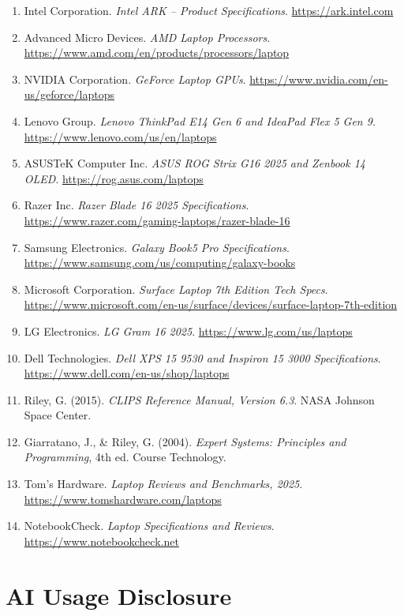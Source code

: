\documentclass[12pt,a4paper]{article}
\begin{document}
\begin{enumerate}
    \item Intel Corporation. \textit{Intel ARK -- Product Specifications}. \url{https://ark.intel.com}
    \item Advanced Micro Devices. \textit{AMD Laptop Processors}. \url{https://www.amd.com/en/products/processors/laptop}
    \item NVIDIA Corporation. \textit{GeForce Laptop GPUs}. \url{https://www.nvidia.com/en-us/geforce/laptops}
    \item Lenovo Group. \textit{Lenovo ThinkPad E14 Gen 6 and IdeaPad Flex 5 Gen 9}. \url{https://www.lenovo.com/us/en/laptops}
    \item ASUSTeK Computer Inc. \textit{ASUS ROG Strix G16 2025 and Zenbook 14 OLED}. \url{https://rog.asus.com/laptops}
    \item Razer Inc. \textit{Razer Blade 16 2025 Specifications}. \url{https://www.razer.com/gaming-laptops/razer-blade-16}
    \item Samsung Electronics. \textit{Galaxy Book5 Pro Specifications}. \url{https://www.samsung.com/us/computing/galaxy-books}
    \item Microsoft Corporation. \textit{Surface Laptop 7th Edition Tech Specs}. \url{https://www.microsoft.com/en-us/surface/devices/surface-laptop-7th-edition}
    \item LG Electronics. \textit{LG Gram 16 2025}. \url{https://www.lg.com/us/laptops}
    \item Dell Technologies. \textit{Dell XPS 15 9530 and Inspiron 15 3000 Specifications}. \url{https://www.dell.com/en-us/shop/laptops}
    \item Riley, G. (2015). \textit{CLIPS Reference Manual, Version 6.3}. NASA Johnson Space Center.
    \item Giarratano, J., \& Riley, G. (2004). \textit{Expert Systems: Principles and Programming}, 4th ed. Course Technology.
    \item Tom's Hardware. \textit{Laptop Reviews and Benchmarks, 2025}. \url{https://www.tomshardware.com/laptops}
    \item NotebookCheck. \textit{Laptop Specifications and Reviews}. \url{https://www.notebookcheck.net}
\end{enumerate}

\section{AI Usage Disclosure}
\end{document}
